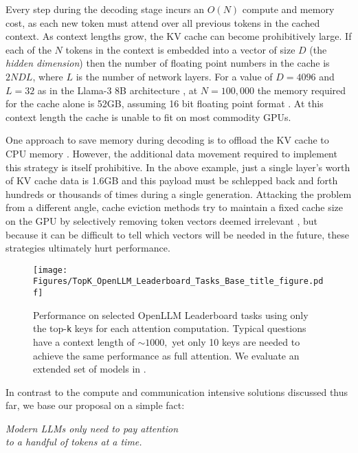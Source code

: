Every step during the decoding stage incurs an $O(N)$ compute and memory cost, as each new token must attend over all previous tokens in the cached context. As context lengths grow, the KV cache can become prohibitively large. If each of the $N$ tokens in the context is embedded into a vector of size $D$ (the \emph{hidden dimension}) then the number of floating point numbers in the cache is $2NDL$, where $L$ is the number of network layers. For a value of $D=4096$ and $L=32$ as in the Llama-3 8B architecture \citep{grattafiori2024llama3herdmodels}, at $N=100,000$ the memory required for the cache alone is 52GB, assuming 16 bit floating point format \citep{zhang2024pqcacheproductquantizationbasedkvcache}. At this context length the cache is unable to fit on most commodity GPUs. 

One approach to save memory during decoding is to offload the KV cache to CPU memory \citep{sheng2023flexgen}. However, the additional data movement required to implement this strategy is itself prohibitive. In the above example, just a single layer's worth of KV cache data is 1.6GB and this payload must be schlepped back and forth hundreds or thousands of times during a single generation. Attacking the problem from a different angle, cache eviction methods try to maintain a fixed cache size on the GPU by selectively removing token vectors deemed irrelevant \citep{zhang2023h2oheavyhitteroracleefficient}, but because it can be difficult to tell which vectors will be needed in the future, these strategies ultimately hurt performance.

\begin{figure}[t!]
    \centering
    \texttt{[image: Figures/TopK\_OpenLLM\_Leaderboard\_Tasks\_Base\_title\_figure.pdf]}
    \caption{Performance on selected OpenLLM Leaderboard tasks using only the top-\texttt{k} keys for each attention computation. Typical questions have a context length of $\sim1000,$ yet only 10 keys are needed to achieve the same performance as full attention. We evaluate an extended set of models in .}
    \label{fig:lm_eval_harness_topk_results_teaser}
\end{figure}

In contrast to the compute and communication intensive solutions discussed thus far, we base our proposal on a simple fact: 

\begin{minipage}{1.0\linewidth}
\centering
\textit{Modern LLMs only need to pay attention\\to a handful of tokens at a time.}
\end{minipage}

